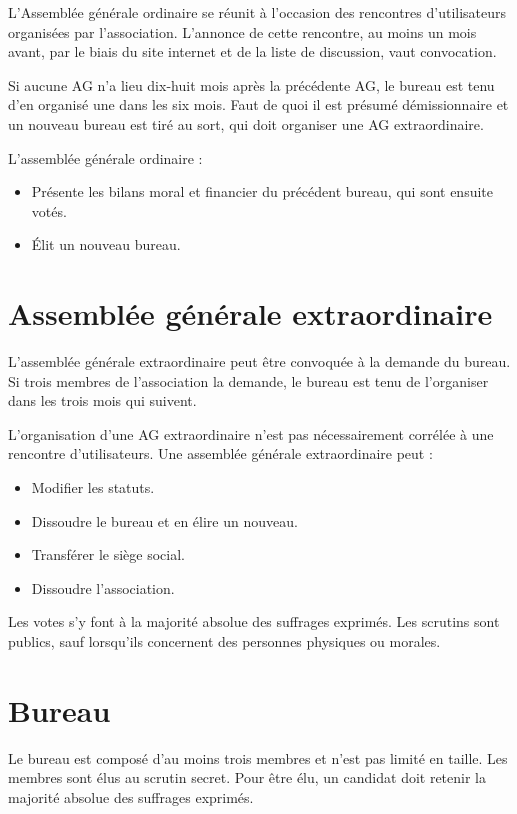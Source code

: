 \documentclass[11pt]{article}
\begin{document}
L'Assemblée générale ordinaire se réunit à l'occasion des rencontres d'utilisateurs organisées par l'association. 
L'annonce de cette rencontre, au moins un mois avant, par le biais du site internet et de la liste de discussion, vaut convocation.

Si aucune AG n'a lieu dix-huit mois après la précédente AG, le bureau est tenu d'en organisé une dans les six mois.
Faut de quoi il est présumé démissionnaire et un nouveau bureau est tiré au sort, qui doit organiser une AG extraordinaire.

L'assemblée générale ordinaire :
\begin{itemize}
	\item Présente les bilans moral et financier du précédent bureau, qui sont ensuite votés.
	\item Élit un nouveau bureau.
\end{itemize}

\section{Assemblée générale extraordinaire}

L'assemblée générale extraordinaire peut être convoquée à la demande du bureau. Si trois membres de l'association la demande, le bureau est tenu de l'organiser dans les trois mois qui suivent.

L'organisation d'une AG extraordinaire n'est pas nécessairement corrélée à une rencontre d'utilisateurs. 
Une assemblée générale extraordinaire peut :
\begin{itemize}
	\item Modifier les statuts.
	\item Dissoudre le bureau et en élire un nouveau.
	\item Transférer le siège social.
	\item Dissoudre l'association.
\end{itemize}

Les votes s'y font à la majorité absolue des suffrages exprimés. Les scrutins sont publics, sauf lorsqu'ils concernent des personnes physiques ou morales.


\section{Bureau}

Le bureau est composé d'au moins trois membres et n'est pas limité en taille. Les membres sont élus au scrutin secret. Pour être élu, un candidat doit retenir la majorité absolue des suffrages exprimés.
\end{document}
